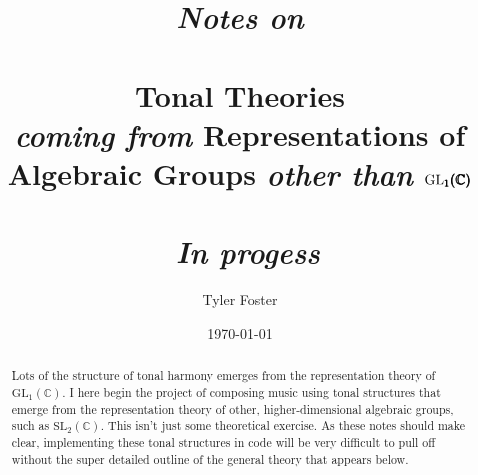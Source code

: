 \documentclass[letterpaper,11pt, reqno]{amsart}
\title{{\smaller\smaller\smaller\smaller\it Notes on}\\ \ \\ Tonal Theories\\ {\smaller\smaller\smaller\it coming from} Representations of\\ Algebraic Groups {\smaller\smaller\smaller\it other than} $\text{GL}_{\pmb{1}}\pmb{(\CC)}$\\ \ \\ \ {\smaller\smaller\smaller\smaller\it \textemdash\ In progess\ \textemdash}}
\date{\today}
\author{Tyler Foster}
\newtheorem{monodromy theorem}{Monodromy Theorem}[subsection]
\newtheorem{wild conjecture}[theorem]{Wild Conjecture}
\newtheorem{research objectives}{Research objectives}[subsection]
\newtheorem{research question}[theorem]{Research questions}
\newtheorem{aside question}[theorem]{Aside question}
\newtheorem{audio example}[theorem]{\loudspeaker[3] Example}
\newtheorem{blank remark}[theorem]{}
\newtheorem{terminology and comment}[theorem]{Terminology and comment}
\newtheorem{purity hypothesis}[theorem]{Purity hypothesis}
\newtheorem{corollary of the purity hypothesis}[theorem]{Corollary of the purity hypothesis}
\newcommand{\CC} {{\mathbb C}}
\numberwithin{equation}{theorem}
\begin{document}
\maketitle

\begin{abstract}
   Lots of the structure of tonal harmony emerges from the representation theory of $\text{GL}_{1}(\CC)$. I here begin the project of composing music using tonal structures that emerge from the representation theory of other, higher-dimensional algebraic groups, such as $\text{SL}_{2}(\CC)$. This isn't just some theoretical exercise. As these notes should make clear, implementing these tonal structures in code will be very difficult to pull off without the super detailed outline of the general theory that appears below.
\end{abstract}

\tableofcontents
\end{document}
